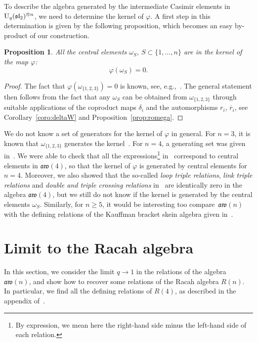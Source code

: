 \documentclass[pdftex]{sigma}
\numberwithin{equation}{section}
\newcommand{\vph}{\varphi}
\newtheorem{prop}[theo]{Proposition}
\theoremstyle{definition}
\newcommand{\rb}{\overline{r}}
\newcommand{\aw}{\mathfrak{aw}(n)}
\begin{document}
To describe the algebra generated by the intermediate Casimir elements in ${\rm U}_q(\mathfrak{sl}_2)^{\otimes n}$, we need to determine the kernel of $\vph$. A first step in this determination is given by the following proposition, which becomes an easy by-product of our construction.
\begin{prop}
All the central elements $\omega_S$, $S\subset\{1,\dots,n\}$ are in the kernel of the map $\vph$:%
\begin{equation*}
\vph(\omega_S)=0.
\end{equation*}
\end{prop}
\begin{proof}
The fact that $\vph(\omega_{\{1,2,3\}})=0$ is known, see, e.g.,~\cite{avatar}. The general statement then follows from the fact that any $\omega_S$ can be obtained from $\omega_{\{1,2,3\}}$ through suitable applications of the coproduct maps $\delta_i$ and the automorphisms $r_i$, $\rb_i$, see Corollary~\ref{coro:deltaW} and Proposition~\ref{prop:romega}.
\end{proof}

We do not know a set of generators for the kernel of $\vph$ in general. For $n=3$, it is known that $\omega_{\{1,2,3\}}$ generates the kernel~\cite{avatar}.
For $n=4$, a generating set was given in~\cite[Appendix~A]{CL}. We were able to check
 that all the expressions\footnote{By expression, we mean here the right-hand side
minus the left-hand side of each relation.} in~\cite[Appendix~A]{CL} correspond to central elements in $\mathfrak{aw}(4)$, so that the kernel of $\vph$ is generated by central elements for $n=4$. Moreover, we also showed that the so-called \textit{loop triple relations}, \textit{link triple relations} and \textit{double and triple crossing relations} in~\cite{CL} are identically zero in the algebra
$\mathfrak{aw}(4)$, but we still do not know if the kernel is generated by the central elements $\omega_S$. Similarly, for $n\geq5$, it would be interesting too compare~$\aw$ with the defining relations of the Kauffman bracket skein algebra given in~\cite{Skein5}.

\section{Limit to the Racah algebra}\label{sec-limit}

In this section, we consider the limit $q\to1$ in the relations of the algebra $\mathfrak{aw}(n)$, and show how to recover some relations of the Racah algebra $R(n)$. In particular, we find all the defining relations of $R(4)$, as described in the appendix of~\cite{CFR}.
\end{document}
